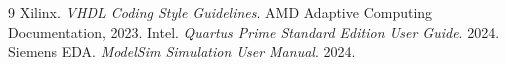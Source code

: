 \documentclass[12pt,oneside,openright,a4paper,brazil]{abntex2}
\begin{document}
\begin{thebibliography}{9}
 Xilinx. \textit{VHDL Coding Style Guidelines}. AMD Adaptive Computing Documentation, 2023.
 Intel. \textit{Quartus Prime Standard Edition User Guide}. 2024.
 Siemens EDA. \textit{ModelSim Simulation User Manual}. 2024.
\end{thebibliography}
\end{document}
